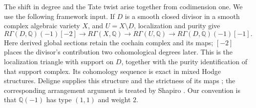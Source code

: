 \documentclass[11pt]{article}
\theoremstyle{definition}
\theoremstyle{remark}
\newcommand{\Q}{\mathbb Q}
\begin{document}
The shift in degree and the Tate twist arise together from codimension one.
We use the following framework input. If $D$ is a smooth closed divisor in
a smooth complex algebraic variety $X$, and $U=X\setminus D$, localization
and purity give
\begin{equation}\label{eq:dag-gysin-realization}
 R\Gamma(D,\Q)(-1)[-2]\longrightarrow R\Gamma(X,\Q)
 \longrightarrow R\Gamma(U,\Q)
 \longrightarrow R\Gamma(D,\Q)(-1)[-1].
\end{equation}
Here derived global sections retain the cochain complex and its maps;
$[-2]$ places the divisor's contribution two cohomological degrees later.
This is the localization triangle with support on $D$, together with the
purity identification of that support complex. Its cohomology sequence is
exact in mixed Hodge structures. Deligne supplies this structure and the
strictness of its maps \cite[\S2.3, \S3]{dagDeligneHodgeII}; the corresponding
arrangement argument is treated by Shapiro \cite{dagShapiro1993}.
Our convention is that $\Q(-1)$ has type $(1,1)$ and weight $2$.
\end{document}
